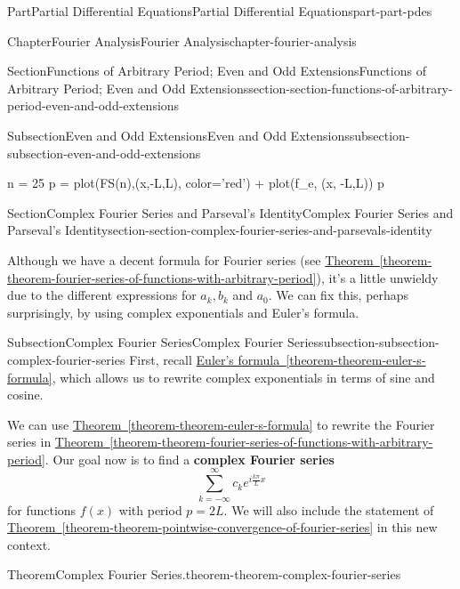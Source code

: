 \documentclass[twoside,10pt,]{book}
\newcommand{\xreffont}{\relax}
\newcommand{\terminology}[1]{\textbf{#1}}
\numberwithin{equation}{part}
\begin{document}
\begin{partptx}{Part}{Partial Differential Equations}{}{Partial Differential Equations}{}{}{part-part-pdes}
\begin{chapterptx}{Chapter}{Fourier Analysis}{}{Fourier Analysis}{}{}{chapter-fourier-analysis}
\begin{sectionptx}{Section}{Functions of Arbitrary Period; Even and Odd Extensions}{}{Functions of Arbitrary Period; Even and Odd Extensions}{}{}{section-section-functions-of-arbitrary-period-even-and-odd-extensions}
\begin{subsectionptx}{Subsection}{Even and Odd Extensions}{}{Even and Odd Extensions}{}{}{subsection-subsection-even-and-odd-extensions}
\begin{sageinput}
n = 25
p = plot(FS(n),(x,-L,L), color='red') + plot(f_e, (x, -L,L))
p
\end{sageinput}
\end{subsectionptx}
\end{sectionptx}
%
%
\typeout{************************************************}
\typeout{************************************************}
%
\begin{sectionptx}{Section}{Complex Fourier Series and Parseval's Identity}{}{Complex Fourier Series and Parseval's Identity}{}{}{section-section-complex-fourier-series-and-parsevals-identity}
\begin{introduction}{}%
Although we have a decent formula for Fourier series (see \hyperref[theorem-theorem-fourier-series-of-functions-with-arbitrary-period]{Theorem~{\xreffont\ref{theorem-theorem-fourier-series-of-functions-with-arbitrary-period}}}), it's a little unwieldy due to the different expressions for \(a_{k},b_{k}\) and \(a_{0}\). We can fix this, perhaps surprisingly, by using complex exponentials and Euler's formula.%
\end{introduction}%
%
%
\typeout{************************************************}
\typeout{************************************************}
%
\begin{subsectionptx}{Subsection}{Complex Fourier Series}{}{Complex Fourier Series}{}{}{subsection-subsection-complex-fourier-series}
First, recall \hyperref[theorem-theorem-euler-s-formula]{Euler's formula~{\xreffont\ref{theorem-theorem-euler-s-formula}}}, which allows us to rewrite complex exponentials in terms of sine and cosine.%
\par
We can use \hyperref[theorem-theorem-euler-s-formula]{Theorem~{\xreffont\ref{theorem-theorem-euler-s-formula}}} to rewrite the Fourier series in \hyperref[theorem-theorem-fourier-series-of-functions-with-arbitrary-period]{Theorem~{\xreffont\ref{theorem-theorem-fourier-series-of-functions-with-arbitrary-period}}}. Our goal now is to find a \terminology{complex Fourier series}%
\begin{equation*}
\sum_{k=-\infty}^{\infty}c_{k}e^{i\frac{k\pi}{L}x}
\end{equation*}
for functions \(f(x)\) with period \(p=2L\). We will also include the statement of \hyperref[theorem-theorem-pointwise-convergence-of-fourier-series]{Theorem~{\xreffont\ref{theorem-theorem-pointwise-convergence-of-fourier-series}}} in this new context.%
\begin{theorem}{Theorem}{Complex Fourier Series.}{}{theorem-theorem-complex-fourier-series}%

\end{theorem}
\end{subsectionptx}
\end{sectionptx}
\end{chapterptx}
\end{partptx}
\end{document}
